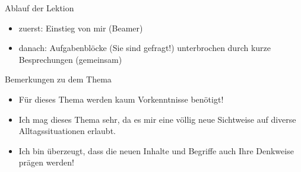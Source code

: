 \begin{frame}[fragile]{Ablauf der Lektion}
\begin{itemize}[<+->]
    \item zuerst: Einstieg von mir (Beamer)
    \item danach: Aufgabenblöcke (Sie sind gefragt!) unterbrochen durch kurze Besprechungen (gemeinsam)
\end{itemize}
\end{frame}


\begin{frame}[fragile]{Bemerkungen zu dem Thema} %
\begin{itemize}[<+->]
    \item Für dieses Thema werden kaum Vorkenntnisse benötigt!
    \item Ich mag dieses Thema sehr, da es mir eine völlig neue Sichtweise auf diverse Alltagssituationen erlaubt.
    \item Ich bin überzeugt, dass die neuen Inhalte und Begriffe auch Ihre Denkweise prägen werden!
\end{itemize}
\end{frame}


